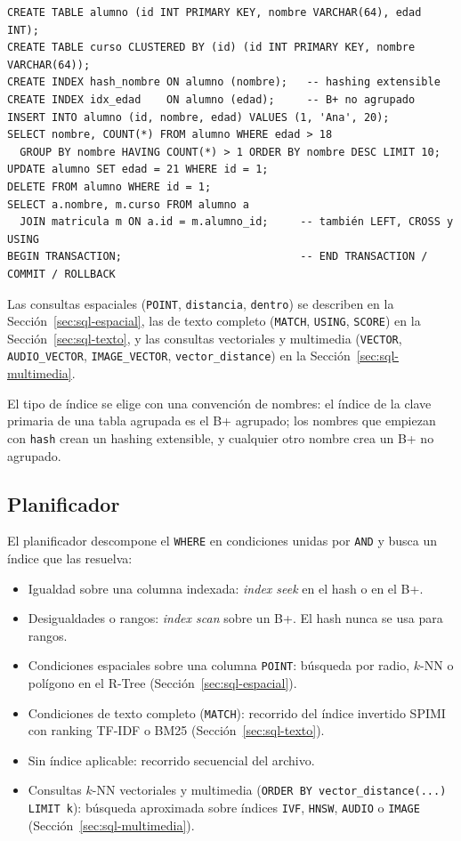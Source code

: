 \documentclass[11pt,a4paper]{article}
\begin{document}
\begin{lstlisting}[style=sql]
CREATE TABLE alumno (id INT PRIMARY KEY, nombre VARCHAR(64), edad INT);
CREATE TABLE curso CLUSTERED BY (id) (id INT PRIMARY KEY, nombre VARCHAR(64));
CREATE INDEX hash_nombre ON alumno (nombre);   -- hashing extensible
CREATE INDEX idx_edad    ON alumno (edad);     -- B+ no agrupado
INSERT INTO alumno (id, nombre, edad) VALUES (1, 'Ana', 20);
SELECT nombre, COUNT(*) FROM alumno WHERE edad > 18
  GROUP BY nombre HAVING COUNT(*) > 1 ORDER BY nombre DESC LIMIT 10;
UPDATE alumno SET edad = 21 WHERE id = 1;
DELETE FROM alumno WHERE id = 1;
SELECT a.nombre, m.curso FROM alumno a
  JOIN matricula m ON a.id = m.alumno_id;     -- también LEFT, CROSS y USING
BEGIN TRANSACTION;                            -- END TRANSACTION / COMMIT / ROLLBACK
\end{lstlisting}

Las consultas espaciales (\texttt{POINT}, \texttt{distancia}, \texttt{dentro}) se describen en la Sección~\ref{sec:sql-espacial}, las de texto completo (\texttt{MATCH}, \texttt{USING}, \texttt{SCORE}) en la Sección~\ref{sec:sql-texto}, y las consultas vectoriales y multimedia (\texttt{VECTOR}, \texttt{AUDIO\_VECTOR}, \texttt{IMAGE\_VECTOR}, \texttt{vector\_distance}) en la Sección~\ref{sec:sql-multimedia}.

El tipo de índice se elige con una convención de nombres: el índice de la clave primaria de una tabla agrupada es el B+ agrupado; los nombres que empiezan con \texttt{hash} crean un hashing extensible, y cualquier otro nombre crea un B+ no agrupado.

\subsection{Planificador}

El planificador descompone el \texttt{WHERE} en condiciones unidas por \texttt{AND} y busca un índice que las resuelva:

\begin{itemize}
  \item Igualdad sobre una columna indexada: \emph{index seek} en el hash o en el B+.
  \item Desigualdades o rangos: \emph{index scan} sobre un B+. El hash nunca se usa para rangos.
  \item Condiciones espaciales sobre una columna \texttt{POINT}: búsqueda por radio, $k$-NN o polígono en el R-Tree (Sección~\ref{sec:sql-espacial}).
  \item Condiciones de texto completo (\texttt{MATCH}): recorrido del índice invertido SPIMI con ranking TF-IDF o BM25 (Sección~\ref{sec:sql-texto}).
  \item Sin índice aplicable: recorrido secuencial del archivo.
  \item Consultas $k$-NN vectoriales y multimedia (\texttt{ORDER BY vector\_distance(...) LIMIT k}): búsqueda aproximada sobre índices \texttt{IVF}, \texttt{HNSW}, \texttt{AUDIO} o \texttt{IMAGE} (Sección~\ref{sec:sql-multimedia}).
\end{itemize}
\end{document}
